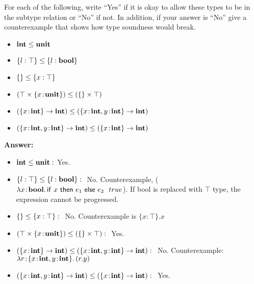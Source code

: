 \documentclass[10pt]{article}
\begin{document}
\begin{exercise}
  For each of the following, write ``Yes'' if it is okay to allow
  these types to be in the subtype relation or ``No'' if not. In
  addition, if your answer is ``No'' give a counterexample that shows
  how type soundness would break.
\begin{itemize}
\item $\typ{int} \subty \typ{unit}$
\item $\{ l : \top \} \subty \{ l : \typ{bool} \}$
\item $\{ \} \subty \{ x : \top \}$ 
\item $(\top \times \{ x \ty \typ{unit} \}) \subty (\{\} \times \top)$
\item $(\{ x \ty \typ{int} \} \arrow \typ{int}) \subty (\{ x \ty \typ{int}, y \ty \typ{int} \} \arrow \typ{int})$
\item $(\{ x \ty \typ{int}, y \ty \typ{int} \} \arrow \typ{int}) \subty (\{ x \ty \typ{int} \} \arrow \typ{int})$
\end{itemize}
\noindent \textbf{Answer:}
\begin{itemize}
\item $\typ{int} \subty \typ{unit}:$ Yes.
\item $\{ l : \top \} \subty \{ l : \typ{bool} \}: \ $ No. Counterexample, ($\lam{x\ty \typ{bool}}{\cond[\lamfnt]{x}{e_1}{e_2}} \ \ true$). If bool is replaced with $\top$ type, the expression cannot be progressed.
\item $\{ \} \subty \{ x : \top \}: \ $ No. Counterexample is $\{ x : \top \}.x$
\item $(\top \times \{ x \ty \typ{unit} \}) \subty (\{\} \times \top): \ $ Yes.
\item $(\{ x \ty \typ{int} \} \arrow \typ{int}) \subty (\{ x \ty \typ{int}, y \ty \typ{int} \} \arrow \typ{int}): \ $ No. Counterexample: $\lam{r\ty \{ x \ty \typ{int}, y \ty \typ{int} \}}{(r.y)}$
\item $(\{ x \ty \typ{int}, y \ty \typ{int} \} \arrow \typ{int}) \subty (\{ x \ty \typ{int} \} \arrow \typ{int}): \ $ Yes.
\end{itemize}
\end{exercise}
\end{document}
